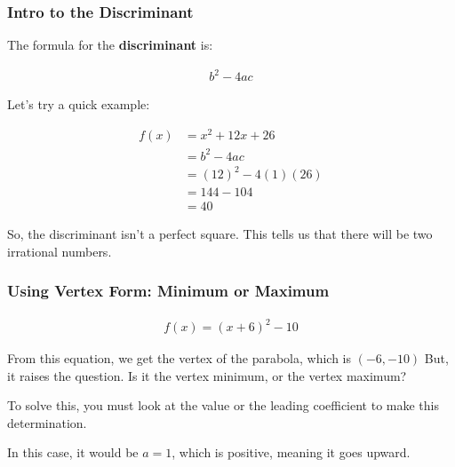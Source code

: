 
\subsubsection*{Intro to the Discriminant}

The formula for the \textbf{discriminant} is:

\begin{align}
    b^2 - 4ac
\end{align}

Let's try a quick example:

\begin{example}
    \begin{align}
        f(x) &= x^2 + 12x + 26 \\
             &= b^2 - 4ac \\
             &= (12)^2 - 4(1)(26) \\
             &= 144 - 104 \\
             &= 40
    \end{align}
    
    So, the discriminant isn't a perfect square. This tells us that there will be two irrational numbers.
\end{example}

\subsubsection*{Using Vertex Form: Minimum or Maximum}

\begin{example}
    \begin{align}
        f(x) = (x + 6)^2 - 10
    \end{align}
    
    From this equation, we get the vertex of the parabola, which is $(-6, -10)$
    But, it raises the question. Is it the vertex minimum, or the vertex maximum?
    
    To solve this, you must look at the value or the leading coefficient to make this determination.
    
    In this case, it would be $a = 1$, which is positive, meaning it goes upward.
\end{example}

\newpage
